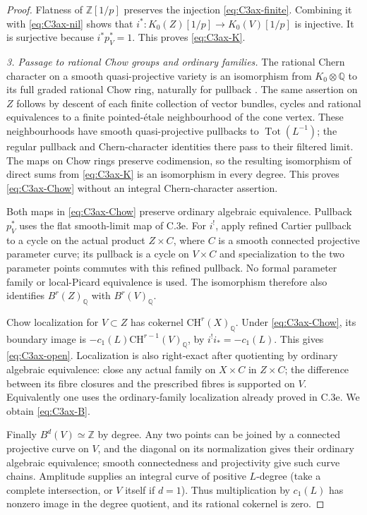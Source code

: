 \begin{proof}
Flatness of $\mathbb Z[1/p]$ preserves the injection
\eqref{eq:C3ax-finite}. Combining it with \eqref{eq:C3ax-nil}
shows that $i^*:K_0(Z)[1/p]\to K_0(V)[1/p]$ is injective.
It is surjective because $i^*p_V^*=1$. This proves
\eqref{eq:C3ax-K}.

\emph{3. Passage to rational Chow groups and ordinary families.}
The rational Chern character on a smooth quasi-projective variety
is an isomorphism from $K_0\otimes\mathbb Q$ to its full graded
rational Chow ring, naturally for pullback
\citep[Example 15.2.16(b), pp.~294--295]{frC4Fulton1998}.
The same assertion on $Z$ follows by
descent of each finite collection of vector bundles, cycles and
rational equivalences to a finite pointed-\'etale neighbourhood
of the cone vertex. These neighbourhoods have smooth
quasi-projective pullbacks to $\operatorname{Tot}(L^{-1})$;
the regular pullback and Chern-character identities there pass
to their filtered limit. The maps on Chow rings preserve codimension,
so the resulting isomorphism of direct sums from
\eqref{eq:C3ax-K} is an isomorphism in every degree. This proves
\eqref{eq:C3ax-Chow} without an integral Chern-character assertion.

Both maps in \eqref{eq:C3ax-Chow} preserve ordinary algebraic
equivalence. Pullback $p_V^*$ uses the flat smooth-limit map
of C.3e. For $i^!$, apply refined Cartier pullback to a cycle
on the actual product $Z\times C$, where $C$ is a smooth
connected projective parameter curve; its pullback is a cycle
on $V\times C$ and specialization to the two parameter points
commutes with this refined pullback. No formal parameter family
or local-Picard equivalence is used. The isomorphism therefore
also identifies $B^r(Z)_{\mathbb Q}$ with $B^r(V)_{\mathbb Q}$.

Chow localization for $V\subset Z$ has cokernel
$\mathrm{CH}^r(X)_{\mathbb Q}$. Under \eqref{eq:C3ax-Chow},
its boundary image is $-c_1(L)\mathrm{CH}^{r-1}(V)_{\mathbb Q}$,
by $i^!i_*=-c_1(L)$. This gives \eqref{eq:C3ax-open}.
Localization is also right-exact after quotienting by ordinary
algebraic equivalence: close any actual family on $X\times C$
in $Z\times C$; the difference between its fibre closures and
the prescribed fibres is supported on $V$. Equivalently one
uses the ordinary-family localization already proved in C.3e.
We obtain \eqref{eq:C3ax-B}.

Finally $B^d(V)\simeq\mathbb Z$ by degree. Any two points can
be joined by a connected projective curve on $V$, and the
diagonal on its normalization gives their ordinary algebraic
equivalence; smooth connectedness and projectivity give such
curve chains. Amplitude supplies an integral curve of positive
$L$-degree (take a complete intersection, or $V$ itself if $d=1$).
Thus multiplication by $c_1(L)$ has nonzero image in the
degree quotient, and its rational cokernel is zero.
\end{proof}
